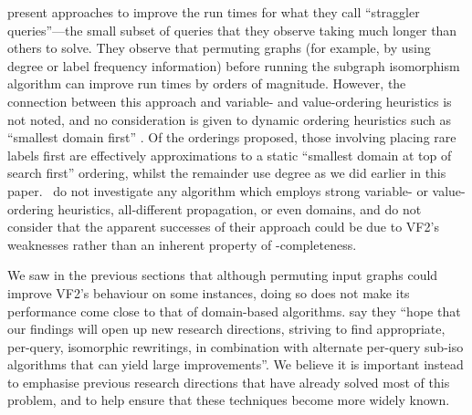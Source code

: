 \documentclass[twoside,11pt]{article}
\begin{document}
 present approaches to improve the run times for what they call
``straggler queries''---the small subset of queries that they observe taking much longer than others
to solve.  They observe that permuting graphs (for example, by using degree or label frequency
information) before running the subgraph isomorphism algorithm can improve run times by orders of
magnitude. However, the connection between this approach and variable- and value-ordering heuristics
is not noted, and no consideration is given to dynamic ordering heuristics such as ``smallest domain
first'' \cite{DBLP:journals/ai/HaralickE80}.  Of the orderings proposed, those involving placing
rare labels first are effectively approximations to a static ``smallest domain at top of search
first'' ordering, whilst the remainder use degree as we did earlier in this paper.
\citeauthor{DBLP:conf/edbt/KatsarouNT17}\ do not investigate any algorithm which employs strong
variable- or value-ordering heuristics, all-different propagation, or even domains, and do not
consider that the apparent successes of their approach could be due to VF2's weaknesses rather than
an inherent property of \NP-completeness.

We saw in the previous sections that although permuting input graphs could improve VF2's behaviour
on some instances, doing so does not make its performance come close to that of domain-based
algorithms.  \citeauthor{DBLP:conf/edbt/KatsarouNT17} say they ``hope that our findings will open up
new research directions, striving to find appropriate, per-query, isomorphic rewritings, in
combination with alternate per-query sub-iso algorithms that can yield large improvements''. We
believe it is important instead to emphasise previous research directions that have already solved
most of this problem, and to help ensure that these techniques become more widely known.
\end{document}
